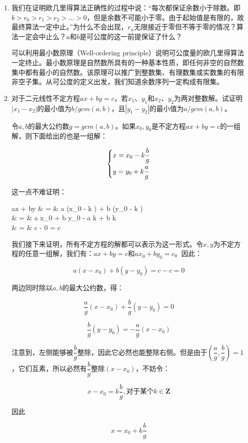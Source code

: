 \documentclass[UTF8]{article}
\begin{document}
\begin{enumerate}
\item 我们在证明欧几里得算法正确性的过程中说：“每次都保证余数小于除数。即$b > r_0 > r_1 > r_2 > ... > 0$，但是余数不可能小于零。由于起始值是有限的，故最终算法一定中止。”为什么不会出现，$r_{n}$无限接近于零但不等于零的情况？算法一定会中止么？$a$和$b$是可公度的这一前提保证了什么？

可以利用最小数原理（Well-ordering principle）说明可公度量的欧几里得算法一定终止。最小数原理是自然数所具有的一种基本性质，即任何非空的自然数集中都有最小的自然数。该原理可以推广到整数集、有理数集或实数集的有限非空子集。从可公度的定义出发，我们知道余数序列一定构成有限集。

\item 对于二元线性不定方程$ax + by = c$，若$x_1$、$y_1$和$x_2$、$y_2$为两对整数解。试证明$|x_1 - x_2|$的最小值为$b/gcm(a, b)$，且$|y_1 - y_2|$的最小值为$a/gcm(a, b)$。

令$a, b$的最大公约数$g = gcm(a, b)$。如果$x_0, y_0$是不定方程$ax + by = c$的一组解，则下面给出的也是一组解：

\[
\begin{dcases}
  x = x_0 - k \dfrac{b}{g} \\
  y = y_0 + k \dfrac{a}{g}
\end{dcases}
\]

这一点不难证明：

\blre
ax + by & = & a (x_0 - k ) + b (y_0 - k ) \\
        & = & a x_0 + b y_0 - a k  + b k  \\
        & = & c - 0 = c
\elre

我们接下来证明，所有不定方程的解都可以表示为这一形式。令$x, y$为不定方程的任意一组解，我们有：$ax + by = c$和$a x_0 + b y_0 = c$。因此：

\[
a (x - x_0) + b (y - y_0) = c - c = 0
\]

两边同时除以$a, b$的最大公约数，得：

\[
\dfrac{a}{g} (x - x_0) + \dfrac{b}{g} (y - y_0) = 0
\]

\[
\dfrac{b}{g} (y - y_0)  = - \dfrac{a}{g} (x - x_0)
\]

注意到，左侧能够被$\dfrac{b}{g}$整除，因此它必然也能整除右侧。但是由于$(\dfrac{a}{g}, \dfrac{b}{g}) = 1$，它们互素，所以必然有$\dfrac{b}{g}$整除$(x - x_0)$，不妨令：

\[
x - x_0 = k \dfrac{b}{g}, \text{对于某个} k \in \pmb{Z}
\]

因此

\[
x = x_0 + k \dfrac{b}{g}
\]


\end{enumerate}
\end{document}
